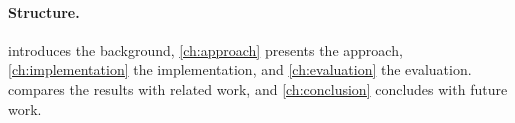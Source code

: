 \paragraph{Structure.}
 introduces the background, \cref{ch:approach} presents the approach, \cref{ch:implementation} the implementation, and \cref{ch:evaluation} the evaluation.  compares the results with related work, and \cref{ch:conclusion} concludes with future work.
